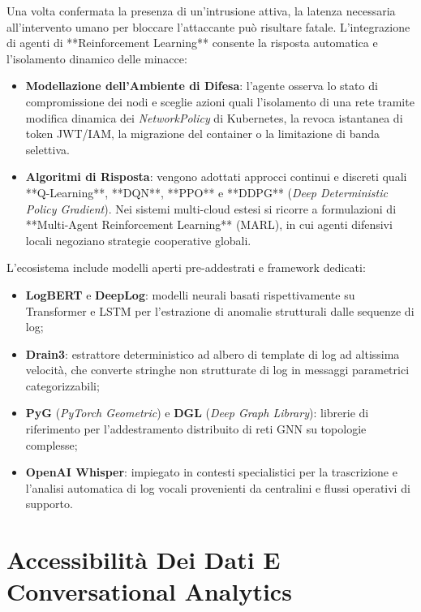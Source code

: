 \documentclass[11pt, a4paper]{article}
\begin{document}
Una volta confermata la presenza di un'intrusione attiva, la latenza necessaria all'intervento umano per bloccare l'attaccante può risultare fatale. L'integrazione di agenti di **Reinforcement Learning** consente la risposta automatica e l'isolamento dinamico delle minacce:
\begin{itemize}
    \item \textbf{Modellazione dell'Ambiente di Difesa}: l'agente osserva lo stato di compromissione dei nodi e sceglie azioni quali l'isolamento di una rete tramite modifica dinamica dei \emph{NetworkPolicy} di Kubernetes, la revoca istantanea di token JWT/IAM, la migrazione del container o la limitazione di banda selettiva.
    \item \textbf{Algoritmi di Risposta}: vengono adottati approcci continui e discreti quali **Q-Learning**, **DQN**, **PPO** e **DDPG** (\emph{Deep Deterministic Policy Gradient}). Nei sistemi multi-cloud estesi si ricorre a formulazioni di **Multi-Agent Reinforcement Learning** (MARL), in cui agenti difensivi locali negoziano strategie cooperative globali.
\end{itemize}

L'ecosistema include modelli aperti pre-addestrati e framework dedicati:
\begin{itemize}
    \item \textbf{LogBERT} e \textbf{DeepLog}: modelli neurali basati rispettivamente su Transformer e LSTM per l'estrazione di anomalie strutturali dalle sequenze di log;
    \item \textbf{Drain3}: estrattore deterministico ad albero di template di log ad altissima velocità, che converte stringhe non strutturate di log in messaggi parametrici categorizzabili;
    \item \textbf{PyG} (\emph{PyTorch Geometric}) e \textbf{DGL} (\emph{Deep Graph Library}): librerie di riferimento per l'addestramento distribuito di reti GNN su topologie complesse;
    \item \textbf{OpenAI Whisper}: impiegato in contesti specialistici per la trascrizione e l'analisi automatica di log vocali provenienti da centralini e flussi operativi di supporto.
\end{itemize}

\newpage


\section{Accessibilità Dei Dati E Conversational Analytics}
\end{document}
